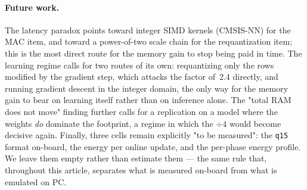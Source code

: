 \paragraph{Future work.} The latency paradox points toward integer SIMD kernels (CMSIS-NN) for the MAC
item, and toward a power-of-two scale chain for the requantization item; this is the most direct route for
the memory gain to stop being paid in time. The learning regime calls for two routes of its own:
requantizing only the rows modified by the gradient step, which attacks the factor of~\num{2.4} directly,
and running gradient descent in the integer domain, the only way for the memory gain to bear on learning
itself rather than on inference alone. The "total RAM does not move" finding further calls for a
replication on a model where the weights \emph{do} dominate the footprint, a regime in which the $\div 4$
would become decisive again. Finally, three cells remain explicitly "to be measured": the \texttt{q15}
format on-board, the energy per online update, and the per-phase energy profile. We leave them empty
rather than estimate them --- the same rule that, throughout this article, separates what is measured
on-board from what is emulated on PC.
